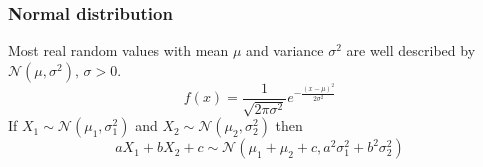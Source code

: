     \subsubsection{Normal distribution}
    Most real random values with mean $\mu$ and variance $\sigma^2$ are well described by $\mathcal{N}(\mu,\sigma^2),\,\sigma>0$.
    \[ f(x) = \frac{1}{\sqrt{2\pi\sigma^2}}e^{-\frac{(x-\mu)^2}{2\sigma^2}} \]
    If $X_1 \sim \mathcal{N}(\mu_1,\sigma_1^2)$ and $X_2 \sim \mathcal{N}(\mu_2,\sigma_2^2)$ then
    \[ aX_1 + bX_2 + c \sim \mathcal{N}(\mu_1+\mu_2+c,a^2\sigma_1^2+b^2\sigma_2^2) \]
    
    
    

